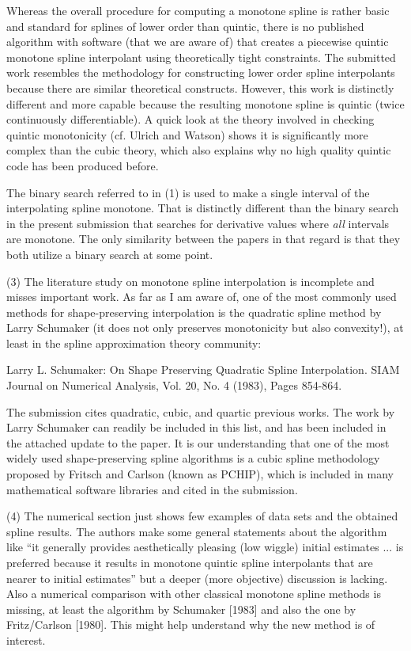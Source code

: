 Whereas the overall procedure for computing a monotone spline is rather basic and standard for splines of lower order than quintic, there is no published algorithm with software (that we are aware of) that creates a piecewise quintic monotone spline interpolant using theoretically tight constraints. The submitted work resembles the methodology for constructing lower order spline interpolants because there are similar theoretical constructs. However, this work is distinctly different and more capable because the resulting monotone spline is quintic (twice continuously differentiable). A quick look at the theory involved in checking quintic monotonicity (cf. Ulrich and Watson) shows it is significantly more complex than the cubic theory, which also explains why no high quality quintic code has been produced before.

The binary search referred to in (1) is used to make a single interval of the interpolating spline monotone. That is distinctly different than the binary search in the present submission that searches for derivative values where {\it all} intervals are monotone. The only similarity between the papers in that regard is that they both utilize a binary search at some point.

{\parindent=20pt \it

\item{(3)} The literature study on monotone spline interpolation is incomplete and misses important work. As far as I am aware of, one of the most commonly used methods for shape-preserving interpolation is the quadratic spline method by Larry Schumaker (it does not only preserves monotonicity but also convexity!), at least in the spline approximation theory community:

\itemitem{} Larry L. Schumaker: On Shape Preserving Quadratic Spline Interpolation. SIAM Journal on Numerical Analysis, Vol. 20, No. 4 (1983), Pages 854-864.

}

The submission cites quadratic, cubic, and quartic previous works. The work by Larry Schumaker can readily be included in this list, and has been included in the attached update to the paper. It is our understanding that one of the most widely used shape-preserving spline algorithms is a cubic spline methodology proposed by Fritsch and Carlson (known as PCHIP), which is included in many mathematical software libraries and cited in the submission. 

{\parindent=20pt \it

\item{(4)} The numerical section just shows few examples of data sets and the obtained spline results. The authors make some general statements about the algorithm like ``it generally provides aesthetically pleasing (low wiggle) initial estimates ... is preferred because it results in monotone quintic spline interpolants that are nearer to initial estimates'' but a deeper (more objective) discussion is lacking. Also a numerical comparison with other classical monotone spline methods is missing, at least the algorithm by Schumaker [1983] and also the one by Fritz/Carlson [1980]. This might help understand why the new method is of interest.

}

